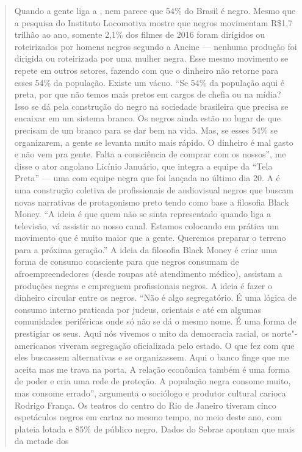 \begin{quote}
Quando a gente liga a , nem parece que 54\% do Brasil é negro. Mesmo
que a pesquisa do Instituto Locomotiva mostre que negros movimentam
R\$1,7 trilhão ao ano, somente 2,1\% dos filmes de 2016 foram dirigidos
ou roteirizados por homens negros segundo a Ancine --- nenhuma produção
foi dirigida ou roteirizada por uma mulher negra. Esse mesmo movimento
se repete em outros setores, fazendo com que o dinheiro não retorne para
esses 54\% da população. Existe um vácuo. ``Se 54\% da população aqui é
preta, por que não temos mais pretos em cargos de chefia ou na mídia?
Isso se dá pela construção do negro na sociedade brasileira que precisa
se encaixar em um sistema branco. Os negros ainda estão no lugar de que
precisam de um branco para se dar bem na vida. Mas, se esses 54\% se
organizarem, a gente se levanta muito mais rápido. O dinheiro é mal
gasto e não vem pra gente. Falta a consciência de comprar com os
nossos'', me disse o ator angolano Licínio Januário, que integra a
equipe da ``Tela Preta'' --- uma  com equipe negra que foi lançada no
último dia 20. A  é uma construção coletiva de profissionais de
audiovisual negros que buscam novas narrativas de protagonismo preto
tendo como base a filosofia Black Money. ``A ideia é que quem não se
sinta representado quando liga a televisão, vá assistir ao nosso canal.
Estamos colocando em prática um movimento que é muito maior que a gente.
Queremos preparar o terreno para a próxima geração.'' A ideia da
filosofia Black Money é criar uma forma de consumo consciente para que
negros consumam de afroempreendedores (desde roupas até atendimento
médico), assistam a produções negras e empreguem profissionais negros. A
ideia é fazer o dinheiro circular entre os negros. ``Não é algo
segregatório. É uma lógica de consumo interno praticada por judeus,
orientais e até em algumas comunidades periféricas onde só não se dá o
mesmo nome. É uma forma de prestigiar os seus. Aqui nós vivemos o mito
da democracia racial, os norte"-americanos viveram segregação
oficializada pelo estado. O que fez com que eles buscassem alternativas
e se organizassem. Aqui o banco finge que me aceita mas me trava na
porta. A relação econômica também é uma forma de poder e cria uma rede
de proteção. A população negra consome muito, mas consome errado'',
argumenta o sociólogo e produtor cultural carioca Rodrigo França. Os
teatros do centro do Rio de Janeiro tiveram cinco espetáculos negros em
cartaz ao mesmo tempo, no meio deste ano, com plateia lotada e 85\% de
público negro. Dados do Sebrae apontam que mais da metade dos

\end{quote}

